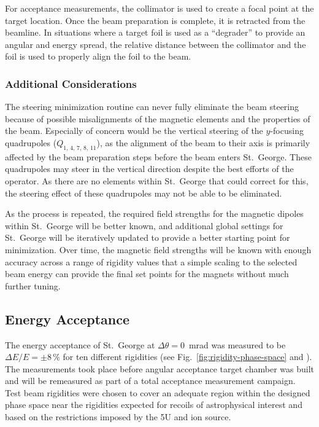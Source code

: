 For acceptance measurements, the collimator is used to create a focal
point at the target location. Once the beam preparation is complete, it
is retracted from the beamline. In situations where a target foil is
used as a ``degrader'' to provide an angular and energy spread, the
relative distance between the collimator and the foil is used to
properly align the foil to the beam.

\subsubsection{Additional Considerations}
The steering minimization routine can never fully eliminate the beam
steering because of possible misalignments of the magnetic elements and
the properties of the beam. Especially of concern would be the vertical
steering of the $y$-focusing quadrupoles ($Q_{1,\,4,\,7,\,8,\,11}$), as
the alignment of the beam to their axis is primarily affected by the
beam preparation steps before the beam enters St.\ George. These
quadrupoles may steer in the vertical direction despite the best efforts
of the operator. As there are no elements within St.\ George that could
correct for this, the steering effect of these quadrupoles may not be
able to be eliminated.

As the process is repeated, the required field strengths for the
magnetic dipoles within St.\ George will be better known, and additional
global settings for St.\ George will be iteratively updated to provide a
better starting point for minimization. Over time, the magnetic field
strengths will be known with enough accuracy across a range of rigidity
values that a simple scaling to the selected beam energy can provide the
final set points for the magnets without much further tuning.

\subsection{Energy Acceptance}

The energy acceptance of St.\ George at $\Delta\theta = 0$~mrad was
measured to be $\Delta E/E = \pm 8$\,\% for ten different rigidities
(see Fig.~\ref{fig:rigidity-phase-space} and \cite{Meisel2017}). The
measurements took place before angular acceptance target chamber was
built and will be remeasured as part of a total acceptance measurement
campaign. Test beam rigidities were chosen to cover an adequate region
within the designed phase space near the rigidities expected for recoils
of astrophysical interest and based on the restrictions imposed by the
5U and ion source.


